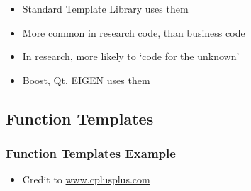 \begin{itemize}
\itemsep1pt\parskip0pt
\item
  Standard Template Library uses them
\item
  More common in research code, than business code
\item
  In research, more likely to `code for the unknown'
\item
  Boost, Qt, EIGEN uses them
\end{itemize}

\subsection{Function Templates}\label{function-templates}

\subsubsection{Function Templates
Example}\label{function-templates-example}

\begin{itemize}
\itemsep1pt\parskip0pt
\item
  Credit to
  \href{http://www.cplusplus.com/doc/tutorial/functions2}{www.cplusplus.com}
\end{itemize}

\begin{Shaded}
\begin{Highlighting}[]
  

 \NormalTok{<} 
\NormalTok{\{}
   
\NormalTok{\}}

 
   \NormalTok{;}
   \NormalTok{;}
  \NormalTok{;}
  \NormalTok{;}
   \NormalTok{;}
\NormalTok{\}}
\end{Highlighting}
\end{Shaded}

